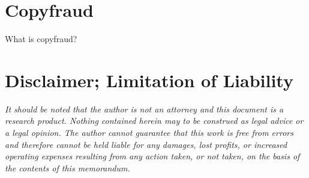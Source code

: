 \documentclass[letterpaper,11pt]{texMemo}
\begin{document}
\section*{Copyfraud}
  What is copyfraud?

\section*{Disclaimer; Limitation of Liability}
\emph{It should be noted that the author is not an attorney and this document is a research product. Nothing contained herein may to be construed as legal advice or a legal opinion. The author cannot guarantee that this work is free from errors and therefore cannot be held liable for any damages, lost profits, or increased operating expenses resulting from any action taken, or not taken, on the basis of the contents of this memorandum.}


\end{document}
